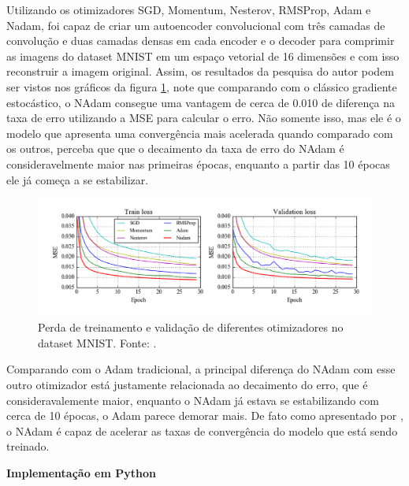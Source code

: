 Utilizando os otimizadores SGD, Momentum, Nesterov, RMSProp, Adam e Nadam, \textcite{NadamMethod} foi capaz de criar um autoencoder convolucional com três camadas de convolução e duas camadas densas em cada encoder e o decoder para comprimir as imagens do dataset MNIST em um espaço vetorial de 16 dimensões e com isso reconstruir a imagem original. Assim, os resultados da pesquisa do autor podem ser vistos nos gráficos da figura \ref{fig:comparativo-nadam-mnist}, note que comparando com o clássico gradiente estocástico, o NAdam consegue uma vantagem de cerca de 0.010 de diferença na taxa de erro utilizando a MSE para calcular o erro. Não somente isso, mas ele é o modelo que apresenta uma convergência mais acelerada quando comparado com os outros, perceba que que o decaimento da taxa de erro do NAdam é consideravelmente maior nas primeiras épocas, enquanto a partir das 10 épocas ele já começa a se estabilizar.

\begin{figure}[h]
    \centering
    \includegraphics[width=1\linewidth]{../imagens/retropropagacao-gradiente/comparativo-nadam-mnist.png}
    
    \caption[Perda de treinamento e validação com diferentes otimizadores]{%
        Perda de treinamento e validação de diferentes otimizadores no dataset MNIST.
        \newline
        \small Fonte: \parencite{NadamMethod}.
    }
    \label{fig:comparativo-nadam-mnist}
\end{figure}
 
Comparando com o Adam tradicional, a principal diferença do NAdam com esse outro otimizador está justamente relacionada ao decaimento do erro, que é consideravalemente maior, enquanto o NAdam já estava se estabilizando com cerca de 10 épocas, o Adam parece demorar mais. De fato como apresentado por \textcite{NadamMethod}, o NAdam é capaz de acelerar as taxas de convergência do modelo que está sendo treinado.

\textbf{Implementação em Python}


